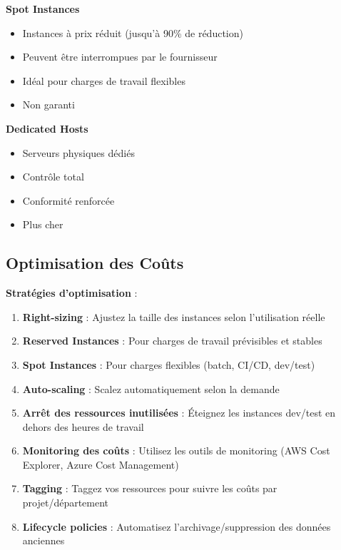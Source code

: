 \documentclass[11pt,a4paper]{article}
\begin{document}
\textbf{Spot Instances}
\begin{itemize}
    \item Instances à prix réduit (jusqu'à 90\% de réduction)
    \item Peuvent être interrompues par le fournisseur
    \item Idéal pour charges de travail flexibles
    \item Non garanti
\end{itemize}

\textbf{Dedicated Hosts}
\begin{itemize}
    \item Serveurs physiques dédiés
    \item Contrôle total
    \item Conformité renforcée
    \item Plus cher
\end{itemize}

\subsection{Optimisation des Coûts}

\begin{tipbox}
\textbf{Stratégies d'optimisation} :
\begin{enumerate}
    \item \textbf{Right-sizing} : Ajustez la taille des instances selon l'utilisation réelle
    \item \textbf{Reserved Instances} : Pour charges de travail prévisibles et stables
    \item \textbf{Spot Instances} : Pour charges flexibles (batch, CI/CD, dev/test)
    \item \textbf{Auto-scaling} : Scalez automatiquement selon la demande
    \item \textbf{Arrêt des ressources inutilisées} : Éteignez les instances dev/test en dehors des heures de travail
    \item \textbf{Monitoring des coûts} : Utilisez les outils de monitoring (AWS Cost Explorer, Azure Cost Management)
    \item \textbf{Tagging} : Taggez vos ressources pour suivre les coûts par projet/département
    \item \textbf{Lifecycle policies} : Automatisez l'archivage/suppression des données anciennes
\end{enumerate}
\end{tipbox}
\end{document}
